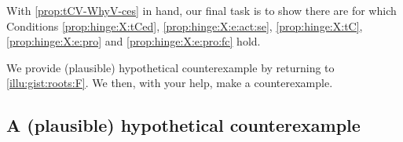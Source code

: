 \begin{note}
  With \autoref{prop:tCV-WhyV-ces} in hand, our final task is to show there are  for which Conditions \ref{prop:hinge:X:tCed}, \ref{prop:hinge:X:e:act:se}, \ref{prop:hinge:X:tC}, \ref{prop:hinge:X:e:pro} and \ref{prop:hinge:X:e:pro:fc} hold.
\end{note}


\begin{note}
  We provide (plausible) hypothetical counterexample by returning to \autoref{illu:gist:roots:F}.
  We then, with your help, make a counterexample.
\end{note}



\subsection{A (plausible) hypothetical counterexample}


